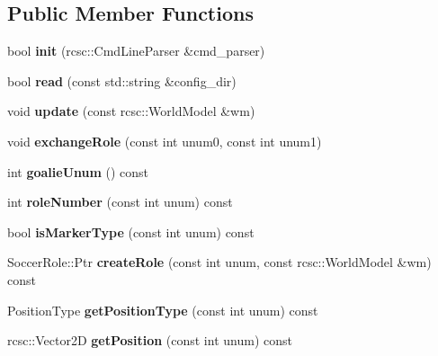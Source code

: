 \subsection*{Public Member Functions}
\begin{DoxyCompactItemize}
\item 
\hypertarget{classStrategy_ad4cc05ea4386910b5382d33bea06b44d}{
bool {\bfseries init} (rcsc::CmdLineParser \&cmd\_\-parser)}
\label{classStrategy_ad4cc05ea4386910b5382d33bea06b44d}

\item 
\hypertarget{classStrategy_a27bbcbeae2799df65277e94e534f3b75}{
bool {\bfseries read} (const std::string \&config\_\-dir)}
\label{classStrategy_a27bbcbeae2799df65277e94e534f3b75}

\item 
\hypertarget{classStrategy_a32ecd0b1d190747a1a2301ff3c944f41}{
void {\bfseries update} (const rcsc::WorldModel \&wm)}
\label{classStrategy_a32ecd0b1d190747a1a2301ff3c944f41}

\item 
\hypertarget{classStrategy_a311abc0d6465b60ddd8cf554e5b49bdb}{
void {\bfseries exchangeRole} (const int unum0, const int unum1)}
\label{classStrategy_a311abc0d6465b60ddd8cf554e5b49bdb}

\item 
\hypertarget{classStrategy_a9b79574735f069eb409b6a9b9bbafb44}{
int {\bfseries goalieUnum} () const }
\label{classStrategy_a9b79574735f069eb409b6a9b9bbafb44}

\item 
\hypertarget{classStrategy_ac2a79ee57ebb4b934323929449f4a148}{
int {\bfseries roleNumber} (const int unum) const }
\label{classStrategy_ac2a79ee57ebb4b934323929449f4a148}

\item 
\hypertarget{classStrategy_a056a53d6058137850847df615b16cb9b}{
bool {\bfseries isMarkerType} (const int unum) const }
\label{classStrategy_a056a53d6058137850847df615b16cb9b}

\item 
\hypertarget{classStrategy_afb72d924b4d06f4fd045e65087c008eb}{
SoccerRole::Ptr {\bfseries createRole} (const int unum, const rcsc::WorldModel \&wm) const }
\label{classStrategy_afb72d924b4d06f4fd045e65087c008eb}

\item 
\hypertarget{classStrategy_aa69976a81adf1b045169c0e8d258bc67}{
PositionType {\bfseries getPositionType} (const int unum) const }
\label{classStrategy_aa69976a81adf1b045169c0e8d258bc67}

\item 
\hypertarget{classStrategy_a058355414bff1d22db01367262678045}{
rcsc::Vector2D {\bfseries getPosition} (const int unum) const }
\label{classStrategy_a058355414bff1d22db01367262678045}

\end{DoxyCompactItemize}
